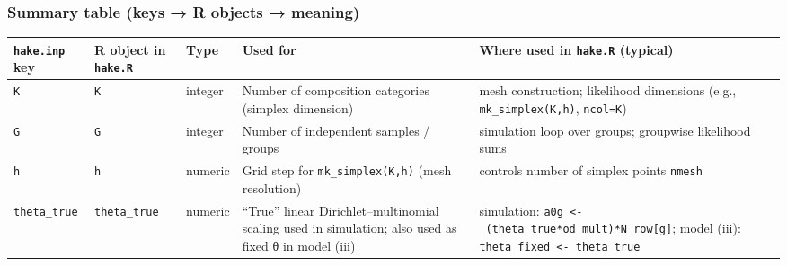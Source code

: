 \documentclass[
]{article}
\begin{document}
\subsubsection{Summary table (keys → R objects →
meaning)}\label{summary-table-keys-r-objects-meaning}

\begin{longtable}[]{@{}
  >{\raggedright\arraybackslash}p{}
  >{\raggedleft\arraybackslash}p{}
  >{\raggedleft\arraybackslash}p{}
  >{\raggedright\arraybackslash}p{}
  >{\raggedright\arraybackslash}p{}@{}}
\toprule\noalign{}
\begin{minipage}[b]{\linewidth}\raggedright
\texttt{hake.inp} key
\end{minipage} & \begin{minipage}[b]{\linewidth}\raggedleft
R object in \texttt{hake.R}
\end{minipage} & \begin{minipage}[b]{\linewidth}\raggedleft
Type
\end{minipage} & \begin{minipage}[b]{\linewidth}\raggedright
Used for
\end{minipage} & \begin{minipage}[b]{\linewidth}\raggedright
Where used in \texttt{hake.R} (typical)
\end{minipage} \\
\midrule\noalign{}
\endhead
\bottomrule\noalign{}
\endlastfoot
\texttt{K} & \texttt{K} & integer & Number of composition categories
(simplex dimension) & mesh construction; likelihood dimensions (e.g.,
\texttt{mk\_simplex(K,h)}, \texttt{ncol=K}) \\
\texttt{G} & \texttt{G} & integer & Number of independent samples /
groups & simulation loop over groups; groupwise likelihood sums \\
\texttt{h} & \texttt{h} & numeric & Grid step for
\texttt{mk\_simplex(K,h)} (mesh resolution) & controls number of simplex
points \texttt{nmesh} \\
\texttt{theta\_true} & \texttt{theta\_true} & numeric & ``True'' linear
Dirichlet--multinomial scaling used in simulation; also used as fixed θ
in model (iii) & simulation:
\texttt{a0g\ \textless{}-\ (theta\_true*od\_mult)*N\_row{[}g{]}}; model
(iii): \texttt{theta\_fixed\ \textless{}-\ theta\_true} \\

\end{longtable}
\end{document}
